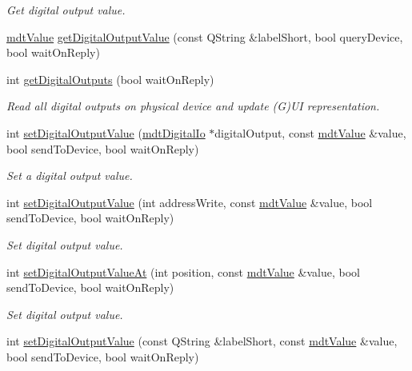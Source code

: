 \begin{DoxyCompactItemize}
\begin{DoxyCompactList}\small\item\em Get digital output value. \end{DoxyCompactList}\item 
\hyperlink{classmdt_value}{mdt\-Value} \hyperlink{classmdt_device_a5e7b7de4243f45d8cfa42599d51555bf}{get\-Digital\-Output\-Value} (const Q\-String \&label\-Short, bool query\-Device, bool wait\-On\-Reply)
\item 
int \hyperlink{classmdt_device_ab35b81b8eb68e161ac06ae882be39a25}{get\-Digital\-Outputs} (bool wait\-On\-Reply)
\begin{DoxyCompactList}\small\item\em Read all digital outputs on physical device and update (G)U\-I representation. \end{DoxyCompactList}\item 
int \hyperlink{classmdt_device_a04564fd9be440c026e7c399f0e619485}{set\-Digital\-Output\-Value} (\hyperlink{classmdt_digital_io}{mdt\-Digital\-Io} $\ast$digital\-Output, const \hyperlink{classmdt_value}{mdt\-Value} \&value, bool send\-To\-Device, bool wait\-On\-Reply)
\begin{DoxyCompactList}\small\item\em Set a digital output value. \end{DoxyCompactList}\item 
int \hyperlink{classmdt_device_a5c2514c3c31a687a01a898c874d2c45e}{set\-Digital\-Output\-Value} (int address\-Write, const \hyperlink{classmdt_value}{mdt\-Value} \&value, bool send\-To\-Device, bool wait\-On\-Reply)
\begin{DoxyCompactList}\small\item\em Set digital output value. \end{DoxyCompactList}\item 
int \hyperlink{classmdt_device_a6b906f01f6b0bdc8586df09a872173ef}{set\-Digital\-Output\-Value\-At} (int position, const \hyperlink{classmdt_value}{mdt\-Value} \&value, bool send\-To\-Device, bool wait\-On\-Reply)
\begin{DoxyCompactList}\small\item\em Set digital output value. \end{DoxyCompactList}\item 
int \hyperlink{classmdt_device_a2377d24cc1e767a24dfc5e34454a8737}{set\-Digital\-Output\-Value} (const Q\-String \&label\-Short, const \hyperlink{classmdt_value}{mdt\-Value} \&value, bool send\-To\-Device, bool wait\-On\-Reply)

\end{DoxyCompactItemize}
